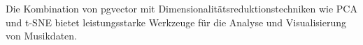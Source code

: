 Die Kombination von pgvector mit Dimensionalitätsreduktionstechniken wie PCA und t-SNE bietet leistungsstarke Werkzeuge für die Analyse und Visualisierung von Musikdaten.




